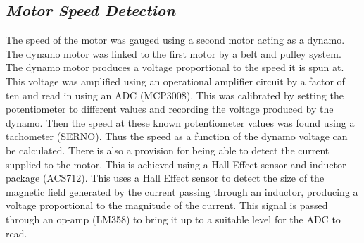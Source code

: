 \documentclass[twoside,a4]{report}
\def\br{\newline \newline \noindent}
\begin{document}
	\subsection*{\textit{Motor Speed Detection}} %
	The speed of the motor was gauged using a second motor acting as a dynamo. The dynamo motor was linked to the first motor by a belt and pulley system. The dynamo motor produces a voltage proportional to the speed it is spun at. This voltage was amplified using an operational amplifier circuit by a factor of ten and read in using an ADC (MCP3008). This was calibrated by setting the potentiometer to different values and recording the voltage produced by the dynamo. Then the speed at these known potentiometer values was found using a tachometer (SERNO). Thus the speed as a function of the dynamo voltage can be calculated. \br
	There is also a provision for being able to detect the current supplied to the motor. This is achieved using a Hall Effect sensor and inductor package (ACS712). This uses a Hall Effect sensor to detect the size of the magnetic field generated by the current passing through an inductor, producing a voltage proportional to the magnitude of the current. This signal is passed through an op-amp (LM358) to bring it up to a suitable level for the ADC to read.
	
\end{document}
